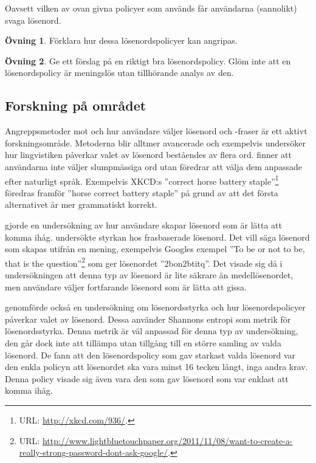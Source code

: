 \documentclass[a4paper]{article}
\theoremstyle{definition}
\newtheorem{exercise}{Övning}
\theoremstyle{remark}
\begin{document}
Oavsett vilken av ovan givna policyer som används får användarna (sannolikt) 
svaga lösenord.

\begin{exercise}
  Förklara hur dessa lösenordspolicyer kan angripas.
\end{exercise}

\begin{exercise}
  Ge ett förslag på en riktigt bra lösenordspolicy.
  Glöm inte att en lösenordspolicy är meningslös utan tillhörande analys av 
  den.
\end{exercise}

\subsection{Forskning på området}

Angreppsmetoder mot och hur användare väljer lösenord och -fraser är ett aktivt 
forskningsområde.
Metoderna blir alltmer avancerade och exempelvis undersöker 
\citet{Bonneau2012lpo} hur lingvistiken påverkar valet av lösenord beståendes 
av flera ord.
\citeauthor{Bonneau2012lpo} finner att användarna inte väljer slumpmässiga ord 
utan föredrar att välja dem anpassade efter naturligt språk.
Exempelvis XKCD:s ''correct horse battery staple''\footnote{%
  URL: \protect\url{http://xkcd.com/936/}.
} föredras framför ''horse correct battery staple'' på grund av att det första 
alternativet är mer grammatiskt korrekt.

\citet{Kuo2006hso} gjorde en undersökning av hur användare skapar lösenord som 
är lätta att komma ihåg.
\citeauthor{Kuo2006hso} undersökte styrkan hos frasbaserade lösenord.
Det vill säga lösenord som skapas utifrån en mening, exempelvis Googles exempel 
''To be or not to be, that is the question''\footnote{%
  URL: \protect\url{http://www.lightbluetouchpaper.org/2011/11/08/want-to-create-a-really-strong-password-dont-ask-google/}.
} som ger lösenordet ''2bon2btitq''.
Det visade sig då i undersökningen att denna typ av lösenord är lite säkrare än 
medellösenordet, men användare väljer fortfarande lösenord som är lätta att 
gissa.

\citet{Komanduri2011opa} genomförde också en undersökning om lösenordsstyrka 
och hur lösenordspolicyer påverkar valet av lösenord.
Dessa använder Shannons entropi \cite{Shannon1948amt} som metrik för 
lösenordsstyrka.
Denna metrik är väl anpassad för denna typ av undersökning, den går dock inte 
att tillämpa utan tillgång till en större samling av valda lösenord.
De fann att den lösenordspolicy som gav starkast valda lösenord var den enkla 
policyn att lösenordet ska vara minst 16 tecken långt, inga andra krav.
Denna policy visade sig även vara den som gav lösenord som var enklast att 
komma ihåg.
\end{document}
